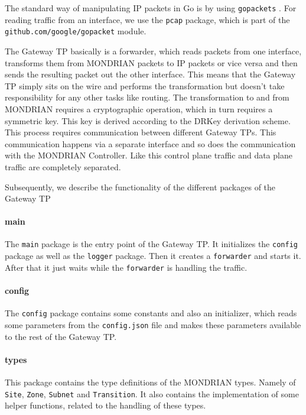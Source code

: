 The standard way of manipulating \acs{IP} packets in Go is by using \texttt{gopackets} \cite{google2020gopacket}. For reading traffic from an interface, we use the \texttt{pcap} package, which is part of the \texttt{github.com/google/gopacket} module. 

The Gateway \acs{TP} basically is a forwarder, which reads packets from one interface, transforms them from MONDRIAN packets to \acs{IP} packets or vice versa and then sends the resulting packet out the other interface. This means that the Gateway \acs{TP} simply sits on the wire and performs the transformation but doesn't take responsibility for any other tasks like routing. The transformation to and from MONDRIAN requires a cryptographic operation, which in turn requires a symmetric key. This key is derived according to the \acs{DRKey} derivation scheme. This process requires communication between different Gateway \acsp{TP}. This communication happens via a separate interface and so does the communication with the MONDRIAN Controller. Like this control plane traffic and data plane traffic are completely separated.

Subsequently, we describe the functionality of the different packages of the Gateway \acs{TP}


\paragraph{main} The \texttt{main} package is the entry point of the Gateway \acs{TP}. It initializes the \texttt{config} package as well as the \texttt{logger} package. Then it creates a \texttt{forwarder} and starts it. After that it just waits while the \texttt{forwarder} is handling the traffic.

\paragraph{config} The \texttt{config} package contains some constants and also an initializer, which reads some parameters from the \texttt{config.json} file and makes these parameters available to the rest of the Gateway \acs{TP}.

\paragraph{types} This package contains the type definitions of the MONDRIAN types. Namely of \texttt{Site}, \texttt{Zone}, \texttt{Subnet} and \texttt{Transition}. It also contains the implementation of some helper functions, related to the handling of these types.

